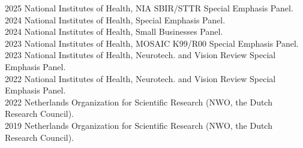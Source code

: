 2025 \hspace{58pt} National Institutes of Health, NIA SBIR/STTR Special Emphasis Panel. \\ 
2024 \hspace{58pt} National Institutes of Health, Special Emphasis Panel. \\ 
2024 \hspace{58pt} National Institutes of Health, Small Businesses Panel. \\
2023 \hspace{58pt} National Institutes of Health, MOSAIC K99/R00 Special Emphasis Panel. \\
2023 \hspace{58pt} National Institutes of Health, Neurotech. and Vision Review Special Emphasis Panel. \\
2022 \hspace{58pt} National Institutes of Health, Neurotech. and Vision Review Special Emphasis Panel. \\
2022 \hspace{58pt} Netherlands Organization for Scientific Research (NWO, the Dutch Research Council). \\
2019 \hspace{58pt} Netherlands Organization for Scientific Research (NWO, the Dutch Research Council). \\
\\